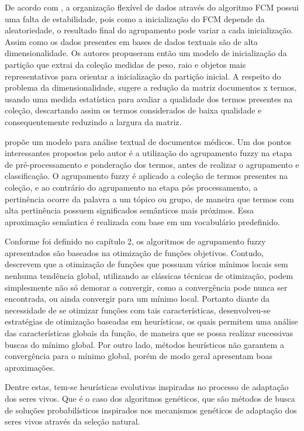 De acordo com \cite{Deng2010}, a organização flexível de dados através do algoritmo FCM possui
uma falta de estabilidade, pois como a inicialização do FCM depende da aleatoriedade, o resultado
final do agrupamento pode variar a cada inicialização. Assim como os dados presentes em bases de
dados textuais são de alta dimensionalidade.  Os autores propuseram então um modelo de inicialização
da partição que extrai da coleção medidas de peso, raio e objetos mais representativos para orientar
a inicialização da partição inicial. A respeito do problema da dimensionalidade, \cite{Deng2010}
sugere a redução da matriz documentos x termos, usando uma medida estatística para avaliar a
qualidade dos termos presentes na coleção, descartando assim os termos considerados de baixa
qualidade e consequentemente reduzindo a largura da matriz.

\cite{Karami2015} propõe um modelo para análise textual de documentos médicos. Um dos pontos
interessantes propostos pelo autor é a utilização do agrupamento fuzzy na etapa de
pré-processamento e ponderação dos termos, antes de realizar o agrupamento e classificação. 
O agrupamento fuzzy é aplicado a coleção de termos presentes na coleção, e ao contrário do
agrupamento na etapa pós processamento, a pertinência ocorre da palavra a um tópico ou grupo, 
de maneira que termos com alta pertinência possuem significados
semânticos mais próximos. Essa aproximação semântica é realizada com base em um vocabulário
predefinido.

Conforme foi definido no capítulo 2, os algoritmos de agrupamento fuzzy apresentados são baseados na
otimização de funções objetivos. Contudo, \cite{GasparCunha2012} descrevem que a otimização de 
funções que possuam vários mínimos locais
sem nenhuma tendência global, utilizando as clássicas técnicas de otimização, podem simplesmente
não só demorar a convergir, como a convergência pode nunca ser encontrada, ou ainda convergir para
um mínimo local. Portanto diante da necessidade de se otimizar funções com
tais características, desenvolveu-se estratégias de otimização baseadas em heurísticas, os quais
permitem uma análise das características globais da função, de maneira que se possa realizar
sucessivas buscas do mínimo global. Por outro lado, métodos heurísticos não garantem a convergência para
o mínimo global, porém de modo geral apresentam boas aproximações. 

Dentre estas, tem-se heurísticas
evolutivas
inspiradas no processo de adaptação dos seres vivos. Que é o caso dos algoritmos
genéticos, que são métodos de busca de soluções probabilísticos inspirados nos mecanismos 
genéticos de adaptação dos seres vivos através da seleção natural. 

